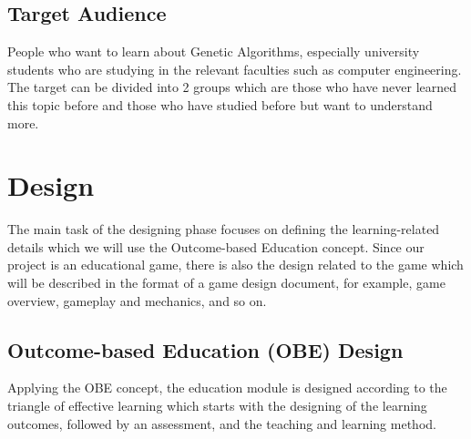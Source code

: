 \documentclass[12pt,oneside,openright,a4paper]{cpe-english-project}
\begin{document}
\subsection{Target Audience}
People who want to learn about Genetic Algorithms, especially university students who are studying in the relevant faculties such as computer engineering. The target can be divided into 2 groups which are those who have never learned this topic before and those who have studied before but want to understand more.


\section{Design}
The main task of the designing phase focuses on defining the learning-related details which we will use the Outcome-based Education concept. Since our project is an educational game, there is also the design related to the game which will be described in the format of a game design document, for example, game overview, gameplay and mechanics, and so on.

\subsection{Outcome-based Education (OBE) Design}
Applying the OBE concept, the education module is designed according to the triangle of effective learning which starts with the designing of the learning outcomes, followed by an assessment, and the teaching and learning method.
\end{document}
